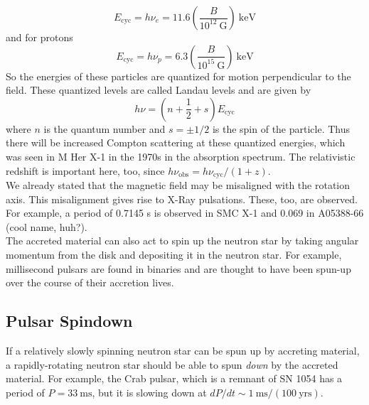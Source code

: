 \documentclass[10pt]{article}
\numberwithin{equation}{section}
\newcommand{\n}{\noindent}
\begin{document}
	\begin{equation}
		\label{eq:xrb:13} E_{\mathrm{cyc}} = h\nu_e = 11.6\left(\frac{B}{10^{12}\ \mathrm{G}}\right)\ \mathrm{keV}
	\end{equation}
	and for protons
	\begin{equation}
		\label{eq:xrb:14} E_{\mathrm{cyc}} = h\nu_p = 6.3\left(\frac{B}{10^{15}\ \mathrm{G}}\right)\ \mathrm{keV}
	\end{equation}
	So the energies of these particles are quantized for motion perpendicular to the field. These quantized levels are called Landau levels and are given by
	\begin{equation}
		\label{eq:xrb:15} h\nu = (n+\frac{1}{2} + s)E_{\mathrm{cyc}}
	\end{equation}
	where $n$ is the quantum number and $s=\pm 1/2$ is the spin of the particle. Thus there will be increased Compton scattering at these quantized energies, which was seen in M Her X-1 in the 1970s in the absorption spectrum. The relativistic redshift is important here, too, since $h\nu_{\mathrm{obs}} = h\nu_{\mathrm{cyc}}/(1+z)$.\\
	
	\n We already stated that the magnetic field may be misaligned with the rotation axis. This misalignment gives rise to X-Ray pulsations. These, too, are observed. For example, a period of 0.7145 s is observed in SMC X-1 and 0.069 in A05388-66 (cool name, huh?).\\
	
	\n The accreted material can also act to spin up the neutron star by taking angular momentum from the disk and depositing it in the neutron star. For example, millisecond pulsars are found in binaries and are thought to have been spun-up over the course of their accretion lives.
	\subsection{Pulsar Spindown} %
	\label{sub:pulsar_spindown}
	If a relatively slowly spinning neutron star can be spun up by accreting material, a rapidly-rotating neutron star should be able to spun \emph{down} by the accreted material. For example, the Crab pulsar, which is a remnant of SN 1054 has a period of $P=33\ \mathrm{ms}$, but it is slowing down at $dP/dt\sim 1\ \mathrm{ms}/(100\ \mathrm{yrs})$.\\
	
\end{document}
